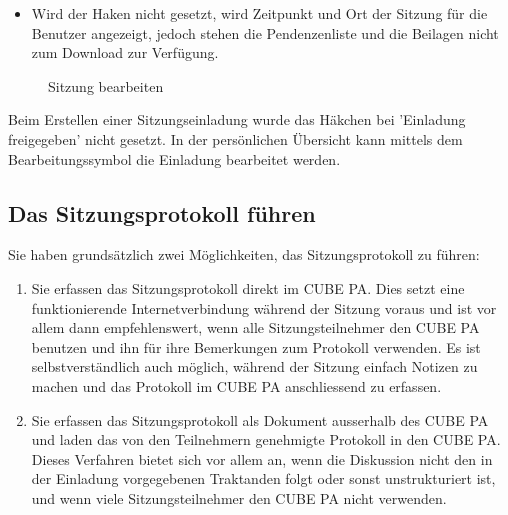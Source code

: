 \begin{itemize}
\item
Wird der Haken nicht gesetzt, wird Zeitpunkt und Ort der Sitzung für die Benutzer angezeigt, jedoch stehen die Pendenzenliste und die Beilagen nicht zum Download zur Verfügung.
\end{itemize}

\begin{figure}[H]
\caption{Sitzung bearbeiten}
\end{figure}

\begin{small}
Beim Erstellen einer Sitzungseinladung wurde das Häkchen bei 'Einladung freigegeben' nicht gesetzt. In der persönlichen Übersicht kann mittels dem Bearbeitungssymbol die Einladung bearbeitet werden.
\end{small}


\subsection{Das Sitzungsprotokoll führen}

Sie haben grundsätzlich zwei Möglichkeiten, das Sitzungsprotokoll zu führen:

\begin{enumerate}
\item
Sie erfassen das Sitzungsprotokoll direkt im CUBE PA. Dies setzt eine funktionierende Internetverbindung während der Sitzung voraus und ist vor allem dann empfehlenswert, wenn alle Sitzungsteilnehmer den CUBE PA benutzen und ihn für ihre Bemerkungen zum Protokoll verwenden. Es ist selbstverständlich auch möglich, während der Sitzung einfach Notizen
zu machen und das Protokoll im CUBE PA anschliessend zu erfassen.
\item
Sie erfassen das Sitzungsprotokoll als Dokument ausserhalb des CUBE PA und laden das von den Teilnehmern genehmigte Protokoll in den CUBE PA. Dieses Verfahren bietet sich vor allem an, wenn die Diskussion nicht den in der Einladung vorgegebenen Traktanden folgt oder sonst unstrukturiert ist, und wenn viele Sitzungsteilnehmer den CUBE PA nicht
verwenden.
\end{enumerate}

